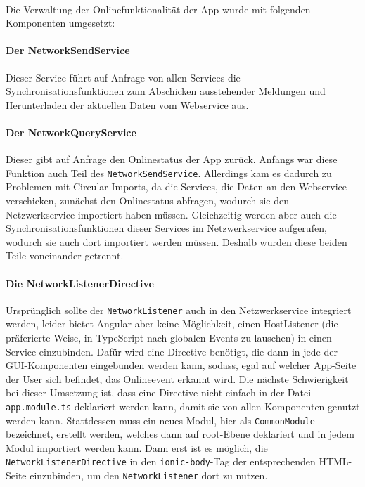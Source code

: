 \documentclass[12pt]{article}
\begin{document}
\paragraph{}
Die Verwaltung der Onlinefunktionalität der App wurde mit folgenden Komponenten umgesetzt: 
\paragraph{Der NetworkSendService} Dieser Service führt auf Anfrage von allen Services die Synchronisationsfunktionen zum Abschicken ausstehender Meldungen und Herunterladen der aktuellen Daten vom Webservice aus.
\paragraph{Der NetworkQueryService} Dieser gibt auf Anfrage den Onlinestatus der App zurück. Anfangs war diese Funktion auch Teil des \texttt{NetworkSendService}. Allerdings kam es dadurch zu Problemen mit Circular Imports, da die Services, die Daten an den Webservice verschicken, zunächst den Onlinestatus abfragen, wodurch sie den Netzwerkservice importiert haben müssen. Gleichzeitig werden aber auch die Synchronisationsfunktionen dieser Services im Netzwerkservice aufgerufen, wodurch sie auch dort importiert werden müssen. Deshalb wurden diese beiden Teile voneinander getrennt.
\paragraph{Die NetworkListenerDirective} Ursprünglich sollte der \texttt{NetworkListener} auch in den Netzwerkservice integriert werden, leider bietet Angular aber keine Möglichkeit, einen HostListener (die präferierte Weise, in TypeScript nach globalen Events zu lauschen) in einen Service einzubinden. Dafür wird eine Directive benötigt, die dann in jede der GUI-Komponenten eingebunden werden kann, sodass, egal auf welcher App-Seite der User sich befindet, das Onlineevent erkannt wird. Die nächste Schwierigkeit bei dieser Umsetzung ist, dass eine Directive nicht einfach in der Datei \texttt{app.module.ts} deklariert werden kann, damit sie von allen Komponenten genutzt werden kann. Stattdessen muss ein neues Modul, hier als \texttt{CommonModule} bezeichnet, erstellt werden, welches dann auf root-Ebene deklariert und in jedem Modul importiert werden kann. Dann erst ist es möglich, die \texttt{NetworkListenerDirective} in den \texttt{ionic-body}-Tag der entsprechenden HTML-Seite einzubinden, um den \texttt{NetworkListener} dort zu nutzen.
\end{document}

